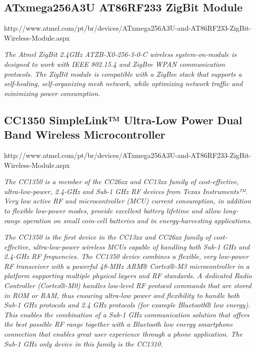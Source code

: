 
\subsection{ATxmega256A3U AT86RF233 ZigBit Module}

\begin{framed}
	
	http://www.atmel.com/pt/br/devices/ATxmega256A3U-and-AT86RF233-ZigBit-Wireless-Module.aspx
	
	\vspace{1em}
	\hline
	\vspace{1em}
	
	\textit{The Atmel ZigBit 2.4GHz ATZB-X0-256-3-0-C wireless system-on-module is designed to work with IEEE 802.15.4 and ZigBee WPAN communication protocols. The ZigBit module is compatible with a ZigBee stack that supports a self-healing, self-organizing mesh network, while optimizing network traffic and minimizing power consumption.}
\end{framed}


\subsection{CC1350 SimpleLink™ Ultra-Low Power Dual Band Wireless Microcontroller}

\begin{framed}
	
	http://www.atmel.com/pt/br/devices/ATxmega256A3U-and-AT86RF233-ZigBit-Wireless-Module.aspx
	
	\vspace{1em}
	\hline
	\vspace{1em}
	
	\textit{The CC1350 is a member of the CC26xx and CC13xx family of cost-effective, ultra-low-power, 2.4-GHz and Sub-1 GHz RF devices from Texas Instruments™. Very low active RF and microcontroller (MCU) current consumption, in addition to flexible low-power modes, provide excellent battery lifetime and allow long-range operation on small coin-cell batteries and in energy-harvesting applications.}
		
		\textit{The CC1350 is the first device in the CC13xx and CC26xx family of cost-effective, ultra-low-power wireless MCUs capable of handling both Sub-1 GHz and 2.4-GHz RF frequencies. The CC1350 device combines a flexible, very low-power RF transceiver with a powerful 48-MHz ARM® Cortex®-M3 microcontroller in a platform supporting multiple physical layers and RF standards. A dedicated Radio Controller (Cortex®-M0) handles low-level RF protocol commands that are stored in ROM or RAM, thus ensuring ultra-low power and flexibility to handle both Sub-1 GHz protocols and 2.4 GHz protocols (for example Bluetooth® low energy). This enables the combination of a Sub-1 GHz communication solution that offers the best possible RF range together with a Bluetooth low energy smartphone connection that enables great user experience through a phone application. The Sub-1 GHz only device in this family is the CC1310.}
\end{framed}


